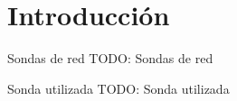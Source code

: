 \section{Introducción}

\begin{frame}{Sondas de red}
  TODO: Sondas de red
\end{frame}

\begin{frame}{Sonda utilizada}
  TODO: Sonda utilizada
\end{frame}

